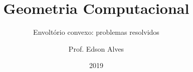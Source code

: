 \title{Geometria Computacional}
\subtitle{Envoltório convexo: problemas resolvidos}
\date{2019}
\author{Prof. Edson Alves}
